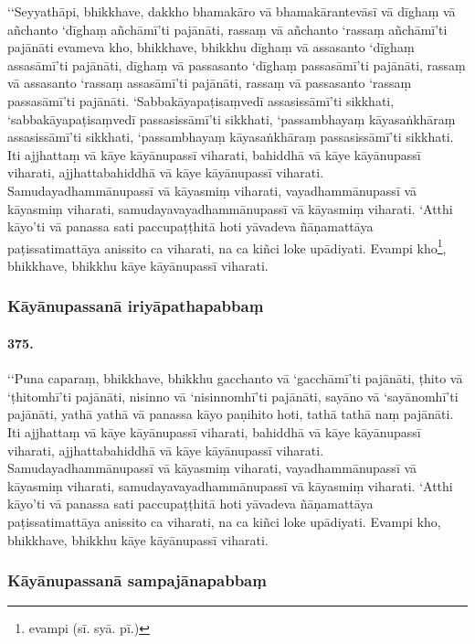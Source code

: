 ‘‘Seyyathāpi, bhikkhave, dakkho bhamakāro vā bhamakārantevāsī vā dīghaṃ vā añchanto ‘dīghaṃ añchāmī’ti pajānāti, rassaṃ vā añchanto ‘rassaṃ añchāmī’ti pajānāti evameva kho, bhikkhave, bhikkhu dīghaṃ vā assasanto ‘dīghaṃ assasāmī’ti pajānāti, dīghaṃ vā passasanto ‘dīghaṃ passasāmī’ti pajānāti, rassaṃ vā assasanto ‘rassaṃ assasāmī’ti pajānāti, rassaṃ vā passasanto ‘rassaṃ passasāmī’ti pajānāti. ‘Sabbakāyapaṭisaṃvedī assasissāmī’ti sikkhati, ‘sabbakāyapaṭisaṃvedī passasissāmī’ti sikkhati, ‘passambhayaṃ kāyasaṅkhāraṃ assasissāmī’ti sikkhati, ‘passambhayaṃ kāyasaṅkhāraṃ passasissāmī’ti sikkhati. Iti ajjhattaṃ vā kāye kāyānupassī viharati, bahiddhā vā kāye kāyānupassī viharati, ajjhattabahiddhā vā kāye kāyānupassī viharati. Samudayadhammānupassī vā kāyasmiṃ viharati, vayadhammānupassī vā kāyasmiṃ viharati, samudayavayadhammānupassī vā kāyasmiṃ viharati. ‘Atthi kāyo’ti vā panassa sati paccupaṭṭhitā hoti yāvadeva ñāṇamattāya paṭissatimattāya anissito ca viharati, na ca kiñci loke upādiyati. Evampi kho\footnote{evampi (sī. syā. pī.)}, bhikkhave, bhikkhu kāye kāyānupassī viharati.


\subsubsection{Kāyānupassanā iriyāpathapabbaṃ}

\paragraph{375.} ‘‘Puna caparaṃ, bhikkhave, bhikkhu gacchanto vā ‘gacchāmī’ti pajānāti, ṭhito vā ‘ṭhitomhī’ti pajānāti, nisinno vā ‘nisinnomhī’ti pajānāti, sayāno vā ‘sayānomhī’ti pajānāti, yathā yathā vā panassa kāyo paṇihito hoti, tathā tathā naṃ pajānāti. Iti ajjhattaṃ vā kāye kāyānupassī viharati, bahiddhā vā kāye kāyānupassī viharati, ajjhattabahiddhā vā kāye kāyānupassī viharati. Samudayadhammānupassī vā kāyasmiṃ viharati, vayadhammānupassī vā kāyasmiṃ viharati, samudayavayadhammānupassī vā kāyasmiṃ viharati. ‘Atthi kāyo’ti vā panassa sati paccupaṭṭhitā hoti yāvadeva ñāṇamattāya paṭissatimattāya anissito ca viharati, na ca kiñci loke upādiyati. Evampi kho, bhikkhave, bhikkhu kāye kāyānupassī viharati.


\subsubsection{Kāyānupassanā sampajānapabbaṃ}

